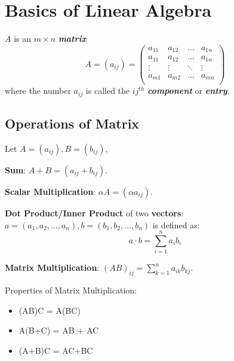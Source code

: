 
\section{Basics of Linear Algebra}

\begin{definition}[Matrix]
    $A$ is an $m \times n$ \textbf{\textit{matrix}}
    \begin{equation*}
        A = (a_{ij}) = \begin{pmatrix}
            a_{11} & a_{12} & \dots  & a_{1n} \\
            a_{11} & a_{12} & \dots  & a_{1n} \\
            \vdots & \vdots & \ddots & \vdots \\
            a_{m1} & a_{m2} & \dots  & a_{mn} \\
        \end{pmatrix}
    \end{equation*}
    where the number $a_{ij}$ is called the $ij ^{th}$ \textbf{\textit{component}} or \textbf{\textit{entry}}.
\end{definition}

\subsection{Operations of Matrix}

Let $A = (a_{ij}), B=(b_{ij})$,

\textbf{Sum}: $A + B = (a_{ij} + b_{ij})$.

\textbf{Scalar Multiplication}: $\alpha A = (\alpha a_{ij})$.

\textbf{Dot Product/Inner Product} of two \textbf{vectors}: $a = (a_{1}, a_{2}, \dots, a_{n}), b = (b_{1}, b_{2}, \dots, b_{n})$ is defined as: \begin{equation*}
    a \cdot b = \sum_{i=1}^{n} a_{i}b_{i}
\end{equation*}

\textbf{Matrix Multiplication}: $(AB)_{ij} = \sum_{k=1}^{n} a_{ik}b_{kj}$.

Properties of Matrix Multiplication:
\begin{itemize}
    \item (AB)C = A(BC)
    \item A(B+C) = AB + AC
    \item (A+B)C = AC+BC
\end{itemize}

